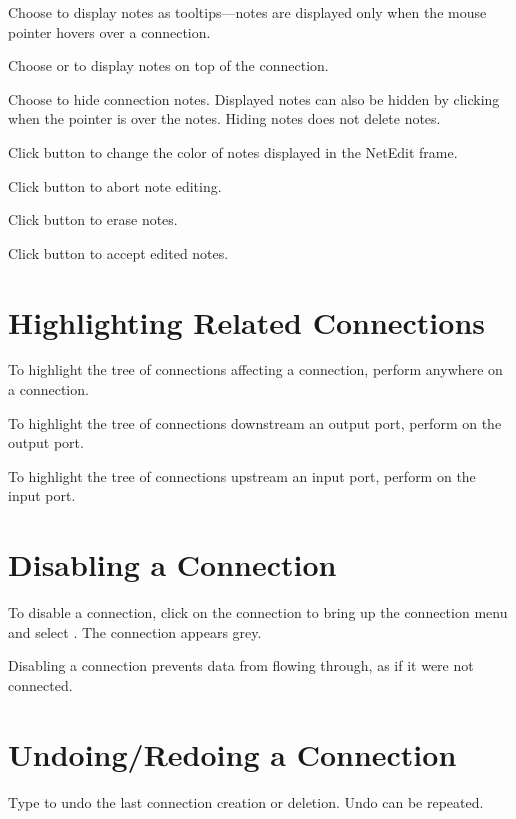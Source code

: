 Choose  to display notes as tooltips---notes are
displayed only when the mouse pointer hovers over a connection.

Choose  or  to display notes on top
of the connection.

Choose  to hide connection notes.  Displayed notes can
also be hidden by clicking  when the pointer is over
the notes.  Hiding notes does not delete notes.

Click button  to change the color of notes
displayed in the NetEdit frame.

Click button  to abort note editing.

Click button  to erase notes.

Click button  to accept edited notes.


\section{Highlighting Related Connections}
\label{sec:highlightconnect}

To highlight the tree of connections affecting a connection, perform
 anywhere on a connection.

To highlight the tree of connections downstream an output port,
perform  on the output port.

To highlight the tree of connections upstream an input port,
perform  on the input port.

\section{Disabling a Connection}
\label{sec:disableconnect}

To disable a connection, click  on the connection to
bring up the connection menu and select . The
connection appears grey.

Disabling a connection prevents data from flowing through, as if it were
not connected.

\section{Undoing/Redoing a Connection}
\label{sec:undomod}

Type  to undo the last connection creation or deletion.
Undo can be repeated.

